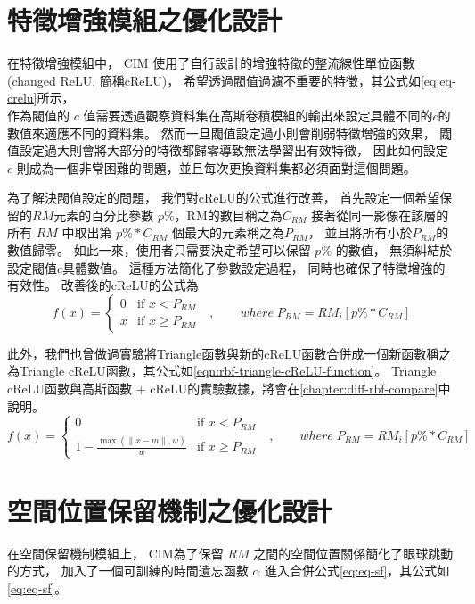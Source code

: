 \documentclass[class=NCU_thesis, crop=false]{standalone}
\begin{document}
\section{特徵增強模組之優化設計}
	在特徵增強模組中，
	CIM 使用了自行設計的增強特徵的整流線性單位函數(changed ReLU, 簡稱cReLU)，
	希望透過閥值過濾不重要的特徵，其公式如\cref{eq:eq-crelu}所示，\\
	
	作為閥值的 $c$ 值需要透過觀察資料集在高斯卷積模組的輸出來設定具體不同的$c$的數值來適應不同的資料集。
	然而一旦閥值設定過小則會削弱特徵增強的效果，
	閥值設定過大則會將大部分的特徵都歸零導致無法學習出有效特徵，
	因此如何設定 $c$ 則成為一個非常困難的問題，並且每次更換資料集都必須面對這個問題。

	為了解決閥值設定的問題，
	我們對cReLU的公式進行改善，
	首先設定一個希望保留的$RM$元素的百分比參數 $p\%$，RM的數目稱之為$C_{RM}$
	接著從同一影像在該層的所有 $RM$ 中取出第 $p\% * C_{RM}$  個最大的元素稱之為$P_{RM}$，
	並且將所有小於$P_{RM}$的數值歸零。
	如此一來，使用者只需要決定希望可以保留 $p\%$ 的數值，
	無須糾結於設定閥值$c$具體數值。
	這種方法簡化了參數設定過程，
	同時也確保了特徵增強的有效性。
	改善後的cReLU的公式為\\
	\begin{equation}
	    \label{eq:eq-cReLUPercent}
	    f(x)= 
	    \begin{cases}
	        0 & \text{if  $x < P_{RM}$ }\\
	        x & \text{if  $x \geq P_{RM}$}
	    \end{cases}, \qquad where \; P_{RM} = RM_{i}\left[ p\% * C_{RM} \right]
	\end{equation}

	 \pagebreak
	此外，我們也曾做過實驗將Triangle函數與新的cReLU函數合併成一個新函數稱之為Triangle cReLU函數，其公式如\cref{eqn:rbf-triangle-cReLU-function}。
	Triangle cReLU函數與高斯函數 + cReLU的實驗數據，將會在\cref{chapter:diff-rbf-compare}中說明。
	\begin{equation}
      \label{eqn:rbf-triangle-cReLU-function}
      f(x)= 
      \begin{cases}
	        0 & \text{if  $x < P_{RM}$ }\\
	        1 - \frac{ \max \left( \| x-m \|, w \right)}{w} & \text{if  $x \geq P_{RM}$}
	   \end{cases}, \qquad where \; P_{RM} = RM_{i}\left[ p\% * C_{RM} \right]
  	\end{equation}

\section{空間位置保留機制之優化設計}
	在空間保留機制模組上，
	CIM為了保留 $RM$ 之間的空間位置關係簡化了眼球跳動的方式，
	加入了一個可訓練的時間遺忘函數 $\alpha$ 進入合併公式\cref{eq:eq-sf}，其公式如\cref{eq:eq-sf}。
		
\end{document}
